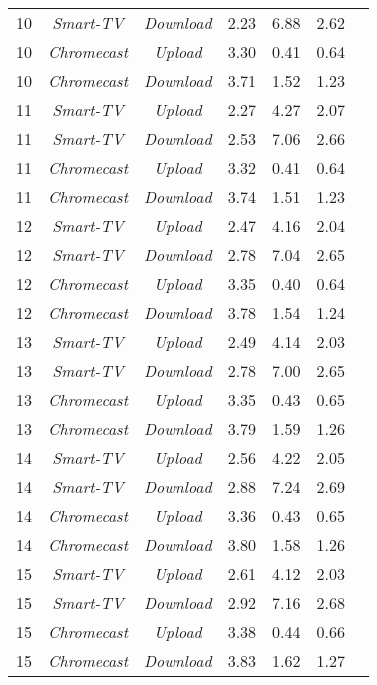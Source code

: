 \begin{longtable}{|c|c|c|c|c|c|c|}
    10 & \textit{Smart-TV} & \textit{Download} & 2.23 & 6.88 & 2.62 \\
    10 & \textit{Chromecast} & \textit{Upload} & 3.30 & 0.41 & 0.64 \\
    10 & \textit{Chromecast} & \textit{Download} & 3.71 & 1.52 & 1.23 \\
    \hline
    11 & \textit{Smart-TV} & \textit{Upload} & 2.27 & 4.27 & 2.07 \\
    11 & \textit{Smart-TV} & \textit{Download} & 2.53 & 7.06 & 2.66 \\
    11 & \textit{Chromecast} & \textit{Upload} & 3.32 & 0.41 & 0.64 \\
    11 & \textit{Chromecast} & \textit{Download} & 3.74 & 1.51 & 1.23 \\
    \hline
    12 & \textit{Smart-TV} & \textit{Upload} & 2.47 & 4.16 & 2.04 \\
    12 & \textit{Smart-TV} & \textit{Download} & 2.78 & 7.04 & 2.65 \\
    12 & \textit{Chromecast} & \textit{Upload} & 3.35 & 0.40 & 0.64 \\
    12 & \textit{Chromecast} & \textit{Download} & 3.78 & 1.54 & 1.24 \\
    \hline
    13 & \textit{Smart-TV} & \textit{Upload} & 2.49 & 4.14 & 2.03 \\
    13 & \textit{Smart-TV} & \textit{Download} & 2.78 & 7.00 & 2.65 \\
    13 & \textit{Chromecast} & \textit{Upload} & 3.35 & 0.43 & 0.65 \\
    13 & \textit{Chromecast} & \textit{Download} & 3.79 & 1.59 & 1.26 \\
    \hline
    14 & \textit{Smart-TV} & \textit{Upload} & 2.56 & 4.22 & 2.05 \\
    14 & \textit{Smart-TV} & \textit{Download} & 2.88 & 7.24 & 2.69 \\
    14 & \textit{Chromecast} & \textit{Upload} & 3.36 & 0.43 & 0.65 \\
    14 & \textit{Chromecast} & \textit{Download} & 3.80 & 1.58 & 1.26 \\
    \hline
    15 & \textit{Smart-TV} & \textit{Upload} & 2.61 & 4.12 & 2.03 \\
    15 & \textit{Smart-TV} & \textit{Download} & 2.92 & 7.16 & 2.68 \\
    15 & \textit{Chromecast} & \textit{Upload} & 3.38 & 0.44 & 0.66 \\
    15 & \textit{Chromecast} & \textit{Download} & 3.83 & 1.62 & 1.27 \\

\end{longtable}
